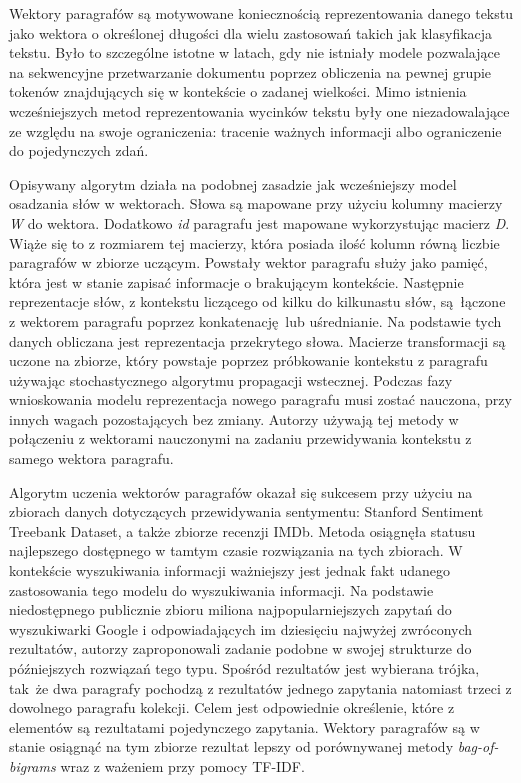 Wektory paragrafów są motywowane koniecznością reprezentowania danego tekstu jako wektora o określonej długości dla wielu zastosowań takich jak klasyfikacja tekstu. Było to szczególne istotne w latach, gdy nie istniały modele pozwalające na sekwencyjne przetwarzanie dokumentu poprzez obliczenia na pewnej grupie tokenów znajdujących się w kontekście o zadanej wielkości. Mimo istnienia wcześniejszych metod reprezentowania wycinków tekstu były one niezadowalające ze względu na swoje ograniczenia: tracenie ważnych informacji albo ograniczenie do pojedynczych zdań.\autocite{le2014distributed}\newline

Opisywany algorytm działa na podobnej zasadzie jak wcześniejszy model osadzania słów w wektorach. Słowa są mapowane przy użyciu kolumny macierzy \emph{W} do wektora. Dodatkowo \emph{id} paragrafu jest mapowane wykorzystując macierz \emph{D}. Wiąże się to z rozmiarem tej macierzy, która posiada ilość kolumn równą liczbie paragrafów w zbiorze uczącym. Powstały wektor paragrafu służy jako pamięć, która jest w stanie zapisać informacje o brakującym kontekście. Następnie reprezentacje słów, z kontekstu liczącego od kilku do kilkunastu słów, są łączone z wektorem paragrafu poprzez konkatenację lub uśrednianie. Na podstawie tych danych obliczana jest reprezentacja przekrytego słowa. Macierze transformacji są uczone na zbiorze, który powstaje poprzez próbkowanie kontekstu z paragrafu używając stochastycznego algorytmu propagacji wstecznej. Podczas fazy wnioskowania modelu reprezentacja nowego paragrafu musi zostać nauczona, przy innych wagach pozostających bez zmiany. Autorzy używają tej metody w połączeniu z wektorami nauczonymi na zadaniu przewidywania kontekstu z samego wektora paragrafu.\autocite{le2014distributed}\newline

Algorytm uczenia wektorów paragrafów okazał się sukcesem przy użyciu na zbiorach danych dotyczących przewidywania sentymentu: Stanford Sentiment Treebank Dataset, a także zbiorze recenzji IMDb. Metoda osiągnęła statusu najlepszego dostępnego w tamtym czasie rozwiązania na tych zbiorach. W kontekście wyszukiwania informacji ważniejszy jest jednak fakt udanego zastosowania tego modelu do wyszukiwania informacji. Na podstawie niedostępnego publicznie zbioru miliona najpopularniejszych zapytań do wyszukiwarki Google i odpowiadających im dziesięciu najwyżej zwróconych rezultatów, autorzy zaproponowali zadanie podobne w swojej strukturze do późniejszych rozwiązań tego typu. Spośród rezultatów jest wybierana trójka, tak że dwa paragrafy pochodzą z rezultatów jednego zapytania natomiast trzeci z dowolnego paragrafu kolekcji. Celem jest odpowiednie określenie, które z elementów są rezultatami pojedynczego zapytania. Wektory paragrafów są w stanie osiągnąć na tym zbiorze rezultat lepszy od porównywanej metody \emph{bag-of-bigrams} wraz z ważeniem przy pomocy TF-IDF.\autocite{le2014distributed}\newline  


